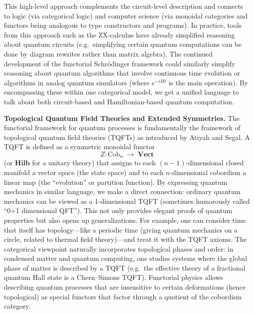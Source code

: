 \documentclass[12pt]{article}
\begin{document}
This high-level approach complements the circuit-level description and connects to logic (via categorical logic) and computer science (via monoidal categories and functors being analogous to type constructors and programs). In practice, tools from this approach such as the ZX-calculus have already simplified reasoning about quantum circuits (e.g.\ simplifying certain quantum computations can be done by diagram rewrites rather than matrix algebra). The continued development of the functorial Schrödinger framework could similarly simplify reasoning about quantum algorithms that involve continuous time evolution or algorithms in analog quantum simulators (where $e^{-iHt}$ is the main operation). By encompassing these within one categorical model, we get a unified language to talk about both circuit-based and Hamiltonian-based quantum computation.

\medskip
\textbf{Topological Quantum Field Theories and Extended Symmetries.} The functorial framework for quantum processes is fundamentally the framework of topological quantum field theories (TQFTs) as introduced by Atiyah and Segal. A TQFT is defined as a symmetric monoidal functor 
\[
   Z: \mathrm{Cob}_n \;\to\; \mathbf{Vect}
\]
(or $\mathbf{Hilb}$ for a unitary theory) that assigns to each $(n-1)$-dimensional closed manifold a vector space (the state space) and to each $n$-dimensional cobordism a linear map (the ``evolution'' or partition function). By expressing quantum mechanics in similar language, we make a direct connection: ordinary quantum mechanics can be viewed as a 1-dimensional TQFT (sometimes humorously called ``0+1 dimensional QFT''). This not only provides elegant proofs of quantum properties but also opens up generalizations. For example, one can consider time that itself has topology---like a periodic time (giving quantum mechanics on a circle, related to thermal field theory)---and treat it with the TQFT axioms. The categorical viewpoint naturally incorporates topological phases and order: in condensed matter and quantum computing, one studies systems where the global phase of matter is described by a TQFT (e.g.\ the effective theory of a fractional quantum Hall state is a Chern--Simons TQFT). Functorial physics allows describing quantum processes that are insensitive to certain deformations (hence topological) as special functors that factor through a quotient of the cobordism category.
\end{document}
